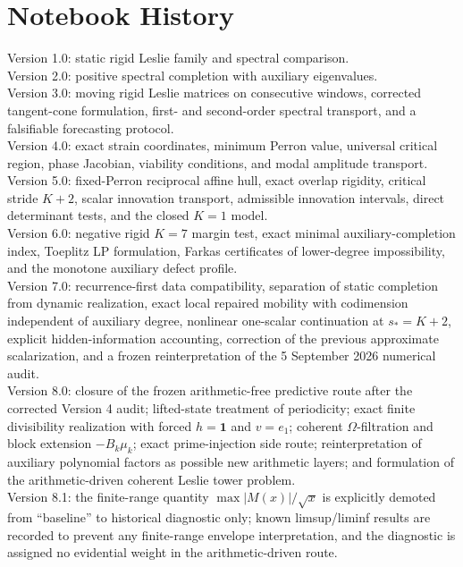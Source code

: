 \documentclass[11pt]{amsart}
\numberwithin{equation}{section}
\theoremstyle{plain}
\theoremstyle{definition}
\theoremstyle{remark}
\begin{document}
\section*{Notebook History}
Version 1.0: static rigid Leslie family and spectral comparison.\\
Version 2.0: positive spectral completion with auxiliary eigenvalues.\\
Version 3.0: moving rigid Leslie matrices on consecutive windows, corrected tangent-cone formulation, first- and second-order spectral transport, and a falsifiable forecasting protocol.\\
Version 4.0: exact strain coordinates, minimum Perron value, universal critical region, phase Jacobian, viability conditions, and modal amplitude transport.\\
Version 5.0: fixed-Perron reciprocal affine hull, exact overlap rigidity, critical stride $K+2$, scalar innovation transport, admissible innovation intervals, direct determinant tests, and the closed $K=1$ model.\\
Version 6.0: negative rigid $K=7$ margin test, exact minimal auxiliary-completion index, Toeplitz LP formulation, Farkas certificates of lower-degree impossibility, and the monotone auxiliary defect profile.\\
Version 7.0: recurrence-first data compatibility, separation of static completion from dynamic realization, exact local repaired mobility with codimension independent of auxiliary degree, nonlinear one-scalar continuation at $s_*=K+2$, explicit hidden-information accounting, correction of the previous approximate scalarization, and a frozen reinterpretation of the 5 September 2026 numerical audit.\\
Version 8.0: closure of the frozen arithmetic-free predictive route after the corrected Version 4 audit; lifted-state treatment of periodicity; exact finite divisibility realization with forced $h=\mathbf1$ and $v=e_1$; coherent $\Omega$-filtration and block extension $-B_k\mu_k$; exact prime-injection side route; reinterpretation of auxiliary polynomial factors as possible new arithmetic layers; and formulation of the arithmetic-driven coherent Leslie tower problem.\\
Version 8.1: the finite-range quantity $\max |M(x)|/\sqrt{x}$ is explicitly demoted from ``baseline'' to historical diagnostic only; known limsup/liminf results are recorded to prevent any finite-range envelope interpretation, and the diagnostic is assigned no evidential weight in the arithmetic-driven route.
\end{document}
